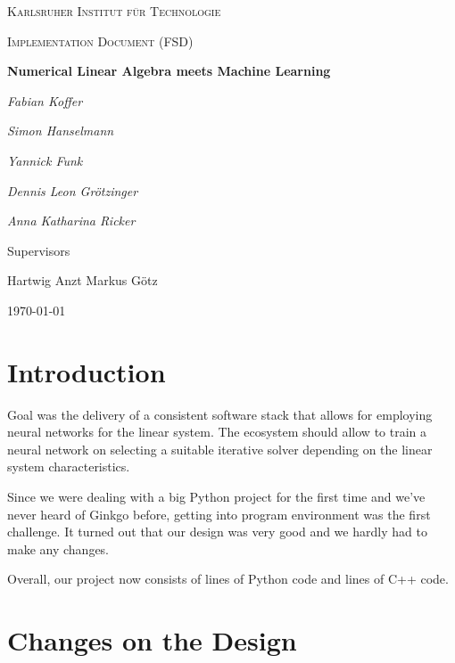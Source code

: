 \documentclass[parskip=full]{scrartcl}
\begin{document}
\begin{titlepage}
\centering
{\scshape\LARGE Karlsruher Institut für Technologie\par}
\vspace{1cm}
{\scshape\Large Implementation Document (FSD)\par}
\vspace{1.5cm}
{\huge\bfseries Numerical Linear Algebra meets Machine Learning \par}
\vspace {2cm}

{\Large\itshape Fabian Koffer\par}
{\Large\itshape Simon Hanselmann\par}
{\Large\itshape Yannick Funk\par}
{\Large\itshape Dennis Leon Gr\"{o}tzinger\par}
{\Large\itshape Anna Katharina Ricker\par}

\vfill
Supervisors\par
Hartwig Anzt
Markus G\"{o}tz

\vfill
{\large\today\par}
\end{titlepage}

\tableofcontents
\newpage


\section{Introduction}
Goal was the delivery of a consistent software stack that allows for employing \glspl{neural network} for the linear system. 
The ecosystem should allow to train a \gls{neural network} on selecting a suitable \gls{iterative solver} depending on the linear system characteristics.

Since we were dealing with a big Python project for the first time and we've never heard of Ginkgo before, getting into program environment was the first challenge.
It turned out that our design was very good and we hardly had to make any changes.

Overall, our project now consists of lines of Python code and lines of C++ code.

\section{Changes on the Design}
\end{document}
